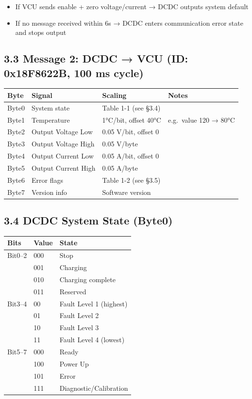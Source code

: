 \documentclass[12pt,a4paper,oneside]{report}
\providecommand{\tightlist}{\setlength{\itemsep}{0pt}\setlength{\parskip}{0pt}}
\begin{document}
\begin{itemize}
\tightlist
\item
  If VCU sends enable + zero voltage/current → DCDC outputs system default
\item
  If no message received within 6s → DCDC enters communication error state and
  stops output
\end{itemize}

\subsection{3.3 Message 2: DCDC → VCU (ID: 0x18F8622B, 100 ms
cycle)}\label{message-2-dcdc-vcu-id-0x18f8622b-100-ms-cycle}

\begin{longtable}[]{@{}llll@{}}
\toprule\noalign{}
Byte & Signal & Scaling & Notes \\
\midrule\noalign{}
\endhead
\bottomrule\noalign{}
\endlastfoot
Byte0 & System state & Table 1-1 (see §3.4) & \\
Byte1 & Temperature & 1°C/bit, offset 40°C & e.g.~value 120 → 80°C \\
Byte2 & Output Voltage Low & 0.05 V/bit, offset 0 & \\
Byte3 & Output Voltage High & 0.05 V/byte & \\
Byte4 & Output Current Low & 0.05 A/bit, offset 0 & \\
Byte5 & Output Current High & 0.05 A/byte & \\
Byte6 & Error flags & Table 1-2 (see §3.5) & \\
Byte7 & Version info & Software version & \\
\end{longtable}

\subsection{3.4 DCDC System State (Byte0)}\label{dcdc-system-state-byte0}

\begin{longtable}[]{@{}lll@{}}
\toprule\noalign{}
Bits & Value & State \\
\midrule\noalign{}
\endhead
\bottomrule\noalign{}
\endlastfoot
Bit0--2 & 000 & Stop \\
& 001 & Charging \\
& 010 & Charging complete \\
& 011 & Reserved \\
Bit3--4 & 00 & Fault Level 1 (highest) \\
& 01 & Fault Level 2 \\
& 10 & Fault Level 3 \\
& 11 & Fault Level 4 (lowest) \\
Bit5--7 & 000 & Ready \\
& 100 & Power Up \\
& 101 & Error \\
& 111 & Diagnostic/Calibration \\
\end{longtable}
\end{document}

